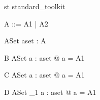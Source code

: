 \begin{zsection}
  \SECTION st \parents standard\_toolkit
\end{zsection}

\begin{zed}
 A ::= A1 | A2
\end{zed}

\begin{schema}{ASet}
 aset : \power A
\end{schema}


\begin{schema}{B}
 ASet
\where
 \forall a : aset @ a = A1
\end{schema}

\begin{schema}{C}
 ASet
\where
 \exists a : aset @ a = A1
\end{schema}


\begin{schema}{D}
 ASet
\where
 \exists_1 a : aset @ a = A1
\end{schema}
